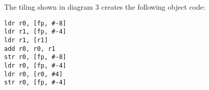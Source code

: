 The tiling shown in diagram 3 creates the following object code:

\begin{lstlisting}
ldr r0, [fp, #-8]
ldr r1, [fp, #-4]
ldr r1, [r1]
add r0, r0, r1
str r0, [fp, #-8]
ldr r0, [fp, #-4]
ldr r0, [r0, #4]
str r0, [fp, #-4]
\end{lstlisting}
